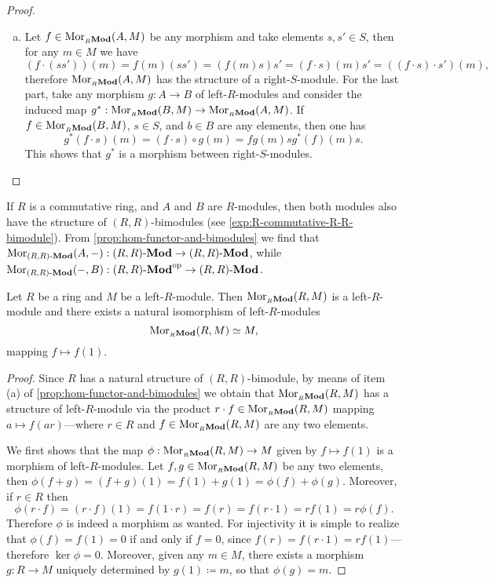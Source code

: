 \begin{proof}
\begin{enumerate}[(a)]
\item Let \(f \in \operatorname{Mor}_{{{}_{R}\textbf{Mod}}}(A, M)\) be any morphism and take elements \(s,
  s' \in S\), then for any \(m \in M\) we have
  \[
  (f \cdot (s s'))(m) = f(m)(s s') = (f(m) s) s'
  = (f \cdot s)(m) s'
  = ((f \cdot s) \cdot s')(m),
  \]
  therefore \(\operatorname{Mor}_{{{}_{R}\textbf{Mod}}}(A, M)\) has the structure of a
  right-\(S\)-module. For the last part, take any morphism \(g: A \to B\) of
  left-\(R\)-modules and consider the induced map \(g^{*}: \operatorname{Mor}_{{{}_{R}\textbf{Mod}}}(B, M)
  \to \operatorname{Mor}_{{{}_{R}\textbf{Mod}}}(A, M)\). If \(f \in \operatorname{Mor}_{{{}_{R}\textbf{Mod}}}(B, M)\), \(s \in S\),
  and \(b \in B\) are any elements, then one has
  \[
  g^{*}(f \cdot s)(m) = (f \cdot s) \circ g(m)
  = f g(m) s
  g^{*}(f)(m) s.
  \]
  This shows that \(g^{*}\) is a morphism between right-\(S\)-modules.
\end{enumerate}
\end{proof}

\begin{example}
\label{exp:R-commutative-hom-functors}
If \(R\) is a commutative ring, and \(A\) and \(B\) are \(R\)-modules, then both
modules also have the structure of \((R, R)\)-bimodules (see
\cref{exp:R-commutative-R-R-bimodule}). From
\cref{prop:hom-functor-and-bimodules} we find that
\(\operatorname{Mor}_{{(R, R)\text{-}\textbf{Mod}}}(A, -): {(R, R)\text{-}\textbf{Mod}} \to {(R, R)\text{-}\textbf{Mod}}\), while
\(\operatorname{Mor}_{{(R, R)\text{-}\textbf{Mod}}}(-, B): {(R, R)\text{-}\textbf{Mod}}^{\mathrm{op}} \to {(R, R)\text{-}\textbf{Mod}}\).
\end{example}

\begin{corollary}
\label{cor:Mor(R-M)-iso-M}
Let \(R\) be a ring and \(M\) be a left-\(R\)-module. Then
\(\operatorname{Mor}_{{{}_{R}\textbf{Mod}}}(R, M)\) is a left-\(R\)-module and there exists a natural
isomorphism of left-\(R\)-modules
\[
\operatorname{Mor}_{{{}_{R}\textbf{Mod}}}(R, M) \simeq M,
\]
mapping \(f \mapsto f(1)\).
\end{corollary}

\begin{proof}
Since \(R\) has a natural structure of \((R, R)\)-bimodule, by means of item (a)
of \cref{prop:hom-functor-and-bimodules} we obtain that
\(\operatorname{Mor}_{{{}_{R}\textbf{Mod}}}(R, M)\) has a structure of left-\(R\)-module via the product
\(r \cdot f \in \operatorname{Mor}_{{{}_{R}\textbf{Mod}}}(R, M)\) mapping \(a \mapsto f(a r)\)---where
\(r \in R\) and \(f \in \operatorname{Mor}_{{{}_{R}\textbf{Mod}}}(R, M)\) are any two elements.

We first shows that the map \(\phi: \operatorname{Mor}_{{{}_{R}\textbf{Mod}}}(R, M) \to M\) given by
\(f \mapsto f(1)\) is a morphism of left-\(R\)-modules. Let
\(f, g \in \operatorname{Mor}_{{{}_{R}\textbf{Mod}}}(R, M)\) be any two elements, then
\(\phi(f + g) = (f + g)(1) = f(1) + g(1) = \phi(f) + \phi(g)\). Moreover, if
\(r \in R\) then
\[
\phi(r \cdot f) = (r \cdot f)(1) = f(1 \cdot r)
= f(r) = f(r \cdot 1) = r f(1) = r \phi(f).
\]
Therefore \(\phi\) is indeed a morphism as wanted. For injectivity it is simple
to realize that \(\phi(f) = f(1) = 0\) if and only if \(f = 0\), since
\(f(r) = f(r \cdot 1) = r f(1)\)---therefore \(\ker \phi = 0\). Moreover, given
any \(m \in M\), there exists a morphism \(g: R \to M\) uniquely determined by
\(g(1) \coloneq m\), so that \(\phi(g) = m\).
\end{proof}

